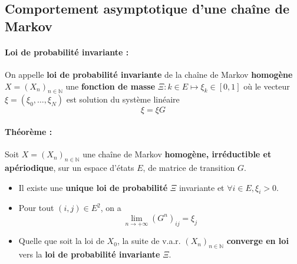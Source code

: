 \documentclass[10pt,a4paper,twoside]{article}
\begin{document}
\subsection{Comportement asymptotique d'une chaîne de Markov}
\paragraph{Loi de probabilité invariante :} On appelle \textbf{loi de probabilité invariante} de la chaîne de Markov \textbf{homogène} $X=(X_{n})_{n\in\mathbb{N}}$ une \textbf{fonction de masse} $\Xi : k \in E \mapsto \xi_{k} \in [0,1]$ où le vecteur $\xi=(\xi_{0},\ldots,\xi_{N})$ est solution du système linéaire
\[ \xi=\xi G  \]

\paragraph{Théorème :} Soit $X=(X_{n})_{n\in\mathbb{N}}$ une chaîne de Markov \textbf{homogène, irréductible et apériodique}, sur un espace d'états $E$, de matrice de transition $G$.
\begin{itemize}
\item Il existe une \textbf{unique loi de probabilité} $\Xi$ invariante et $\forall i\in E, \xi_{i}>0$.
\item Pour tout $(i,j)\in E^{2}$, on a
\[ \lim\limits_{n\rightarrow+\infty} (G^{n})_{ij} = \xi_{j} \]
\item Quelle que soit la loi de $X_{0}$, la suite de v.a.r. $(X_{n})_{n\in\mathbb{N}}$ \textbf{converge en loi} vers la \textbf{loi de probabilité invariante} $\Xi$.
\end{itemize}
\end{document}
